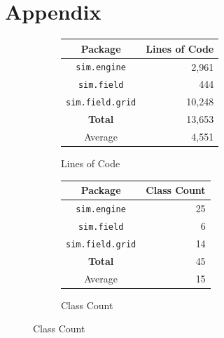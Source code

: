 \documentclass[11pt]{article}
\begin{document}
\newpage
\raggedright
{}

\newpage
\section{Appendix}


\begin{figure}[htp]
\begin{subfigure}[b]{0.5\textwidth}
\begin{center}
\begin{tabular}{|c|r|}
	\hline
	\textbf{Package} & \textbf{Lines of Code} \\
	\hline
	\texttt{sim.engine} & 2,961 \\
	\texttt{sim.field} & 444 \\
	\texttt{sim.field.grid} & 10,248 \\
	\hline
	\textbf{Total} & 13,653 \\
	\hline
	Average & 4,551 \\
	\hline
\end{tabular}
\end{center}
\caption{Lines of Code}
\label{table:loc}
\end{subfigure}
\begin{subfigure}[b]{0.5\textwidth}
\begin{center}
\begin{tabular}{|c|r|}
	\hline
	\textbf{Package} & \textbf{Class Count} \\
	\hline
	\texttt{sim.engine} & 25 \\
	\texttt{sim.field} & 6 \\
	\texttt{sim.field.grid} & 14 \\
	\hline
	\textbf{Total} & 45 \\
	\hline
	Average & 15 \\
	\hline
\end{tabular}
\end{center}
\caption{Class Count}
\label{table:class_count}
\end{subfigure}

\par\bigskip


\end{figure}
\end{document}
